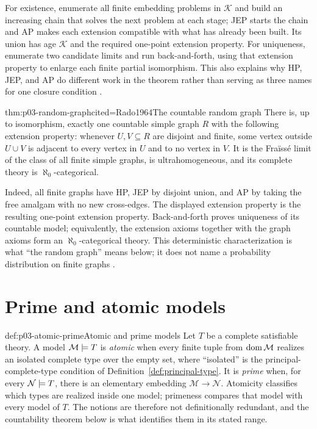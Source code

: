 For existence, enumerate all finite embedding problems in \(\mathcal K\) and
build an increasing chain that solves the next problem at each stage; JEP
starts the chain and AP makes each extension compatible with what has already
been built.  Its union has age \(\mathcal K\) and the required one-point
extension property.  For uniqueness, enumerate two candidate limits and run
back-and-forth, using that extension property to enlarge each finite partial
isomorphism.  This also explains why HP, JEP, and AP do different work in the
theorem rather than serving as three names for one closure condition
\cite{Fraisse1954,Hodges1993}.

\begin{hbtheorem}{thm:p03-random-graph}{cited=Rado1964}{The countable random graph}
There is, up to isomorphism, exactly one countable simple graph \(R\) with the
following extension property: whenever \(U,V\subseteq R\) are disjoint and
finite, some vertex outside \(U\cup V\) is adjacent to every vertex in \(U\)
and to no vertex in \(V\).  It is the Fra\"iss\'e limit of the class of all
finite simple graphs, is ultrahomogeneous, and its complete theory is
\(\aleph_0\)-categorical.
\end{hbtheorem}

Indeed, all finite graphs have HP, JEP by disjoint union, and AP by taking the
free amalgam with no new cross-edges.  The displayed extension property is
the resulting one-point extension property.  Back-and-forth proves uniqueness
of its countable model; equivalently, the extension axioms together with the
graph axioms form an \(\aleph_0\)-categorical theory.  This deterministic
characterization is what ``the random graph'' means below; it does not name a
probability distribution on finite graphs \cite{Rado1964,Marker2002}.

\section{Prime and atomic models}
\label{sec:p03-prime-atomic}

\begin{hbdefinition}{def:p03-atomic-prime}{Atomic and prime models}
Let \(T\) be a complete satisfiable theory.  A model \(\mathcal M\models T\) is
\emph{atomic} when every finite tuple from \(\operatorname{dom}\mathcal M\) realizes an
isolated complete type over the empty set, where ``isolated'' is the
principal-complete-type condition of
Definition~\ref{def:principal-type}.  It is \emph{prime} when, for every
\(\mathcal N\models T\), there is an elementary embedding
\(\mathcal M\to\mathcal N\).  Atomicity classifies which types are realized
inside one model; primeness compares that model with every model of \(T\).
The notions are therefore not definitionally redundant, and the countability
theorem below is what identifies them in its stated range.
\end{hbdefinition}

